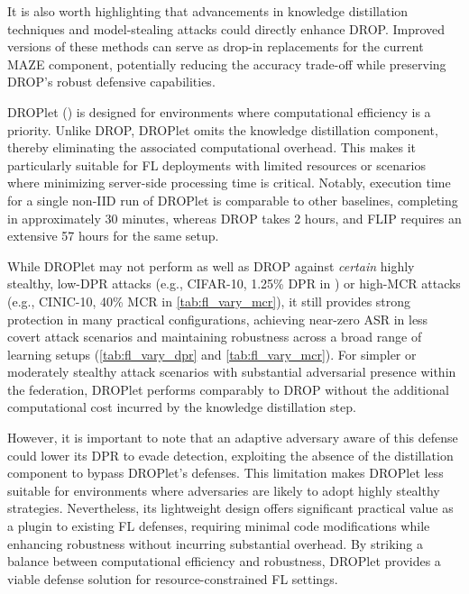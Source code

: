 It is also worth highlighting that advancements in knowledge distillation techniques and model-stealing attacks could directly enhance DROP. Improved versions of these methods can serve as drop-in replacements for the current MAZE component, potentially reducing the accuracy trade-off while preserving DROP’s robust defensive capabilities.

\label{shortsec:droplet_results}
DROPlet () is designed for environments where computational efficiency is a priority. Unlike DROP, DROPlet omits the knowledge distillation component, thereby eliminating the associated computational overhead. This makes it particularly suitable for FL deployments with limited resources or scenarios where minimizing server-side processing time is critical. Notably, execution time for a single non-IID run of DROPlet is comparable to other baselines, completing in approximately 30 minutes, whereas DROP takes 2 hours, and FLIP requires an extensive 57 hours for the same setup. 

While DROPlet may not perform as well as DROP against \textit{certain} highly stealthy, low-DPR attacks (e.g., CIFAR-10, 1.25\% DPR in ) or high-MCR attacks (e.g., CINIC-10, 40\% MCR in \cref{tab:fl_vary_mcr}), it still provides strong protection in many practical configurations, achieving near-zero ASR in less covert attack scenarios and maintaining robustness across a broad range of learning setups (\cref{tab:fl_vary_dpr} and \cref{tab:fl_vary_mcr}). For simpler or moderately stealthy attack scenarios with substantial adversarial presence within the federation, DROPlet performs comparably to DROP without the additional computational cost incurred by the knowledge distillation step.

However, it is important to note that an adaptive adversary aware of this defense could lower its DPR to evade detection, exploiting the absence of the distillation component to bypass DROPlet’s defenses. This limitation makes DROPlet less suitable for environments where adversaries are likely to adopt highly stealthy strategies. Nevertheless, its lightweight design offers significant practical value as a plugin to existing FL defenses, requiring minimal code modifications while enhancing robustness without incurring substantial overhead. By striking a balance between computational efficiency and robustness, DROPlet provides a viable defense solution for resource-constrained FL settings.

